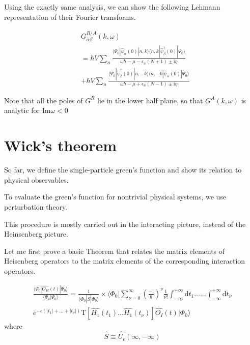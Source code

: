 Using the exactly same analysis, we can show the following Lehmann representation of their Fourier transforms.

\begin{align}\label{2.3.15}
& G^{R/A}_{\alpha\beta}(k,\omega) \nonumber \\
&=\hbar V\sum_n \frac{\langle\Psi_0|\hat \psi_{\alpha}(0)|n,k\rangle\langle n,k|\hat \psi^{
\dagger}_{\beta} (0)|\Psi_0\rangle}{\omega\hbar-\mu-\epsilon_n(N+1)\pm\mathrm{i}\eta}  \nonumber \\
&+\hbar V\sum_n \frac{\langle\Psi_0|\hat \psi^{
\dagger}_{\beta} (0)|n,-k\rangle\langle n,-k|\hat \psi_{\alpha}(0)|\Psi_0\rangle}{\omega\hbar-\mu+\epsilon_n(N-1)\pm\mathrm{i}\eta} \nonumber\tag{2.3.15A/B} 
\end{align}

Note that all the poles of $G^R$ lie in the lower half plane, so that $G^A(k,\omega)$ is analytic for $\mathrm{Im} \omega<0$



\section{Wick's theorem}

So far, we define the single-particle green's function and show its relation to physical observables.

To evaluate the green's function for nontrivial physical systems, we use perturbation theory.

This procedure is mostly carried out in the interacting picture, instead of the Heinsenberg picture.

Let me first prove a basic Theorem that relates the matrix elements of Heisenberg operators to the matrix elements of the corresponding interaction operators.


\begin{align}\label{2.4.1}
\frac{\langle\Psi_0|\hat{O_H}(t)|\Psi_0\rangle}{\langle\Psi_0|\Psi_0\rangle}=\frac{1}{\langle\Phi_0|\hat{S}|\Phi_0\rangle}\times \langle\Phi_0|\sum_{\nu=0}^{\infty}(\frac{-\mathrm{i}}{\hbar})^{\nu} \frac{1}{\nu!} \int_{-\infty}^{+\infty}\mathrm{d}t_1......\int_{-\infty}^{+\infty}\mathrm{d}t_{\nu} \nonumber \\
e^{-\epsilon(|t_1|+...+|t_{\nu}|)}\mathrm{T}[\hat{H_1}(t_1)...\hat{H_1}(t_{\nu})]\hat{O_I}(t)|\Phi_0\rangle
\end{align}
where 
\begin{equation}\label{2.4.2}
\hat{S}\equiv\hat{U_{\epsilon}}(\infty,-\infty)
\end{equation}


